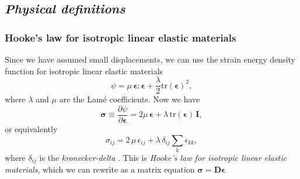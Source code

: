 \documentclass[acmtog]{acmart}
\begin{document}
\subsection*{\textit{Physical definitions}}
\subsubsection*{Hooke's law for isotropic linear elastic materials}
Since we have assumed small displacements, we can use the strain energy density
function for isotropic linear elastic materials
%
\begin{equation}
  \psi = \mu \,\boldsymbol \epsilon : \boldsymbol \epsilon + \frac{\lambda}{2} \mathrm{tr}(\boldsymbol \epsilon)^2,
\end{equation}
%
where $\lambda$ and $\mu$ are the Lamé coefficients. Now we have
%
\begin{equation}
  \boldsymbol \sigma \equiv \frac{ \partial \psi }{ \partial \boldsymbol \epsilon } = 2 \mu \, \boldsymbol \epsilon + \lambda \,\mathrm{tr}(\boldsymbol \epsilon) \, \boldsymbol I,
\end{equation}
%
or equivalently
%
\begin{equation}
  \sigma_{ij} = 2 \,\mu \,\epsilon_{ij} + \lambda \,\delta_{ij} \sum_k \epsilon_{kk},
\end{equation}
%
where $\delta_{ij}$ is the \textit{kronecker-delta} . This is \textit{Hooke's law for
isotropic linear elastic materials}, which we can rewrite as a matrix equation
$\boldsymbol \sigma = \boldsymbol D \boldsymbol \epsilon$
%
\end{document}
